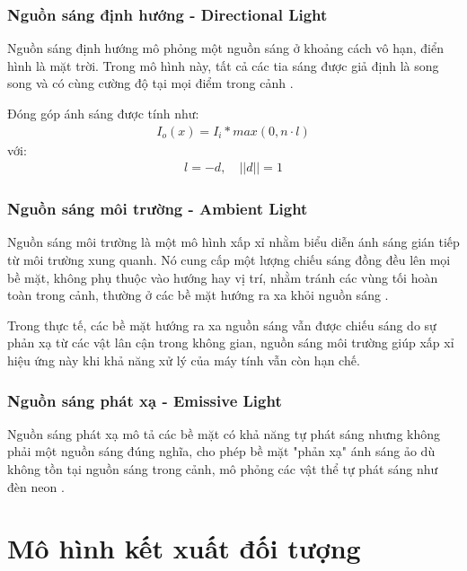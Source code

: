 \subsubsection{Nguồn sáng định hướng - Directional Light}
Nguồn sáng định hướng mô phỏng một nguồn sáng ở khoảng cách vô hạn, điển hình là mặt trời. Trong mô hình này, tất cả các tia sáng được giả định là song song và có cùng cường độ tại mọi điểm trong cảnh \cite{principles_1990}.

Đóng góp ánh sáng được tính như:
\begin{gather*}
	I_o(x) = I_i * max(0, n \cdot l)
\end{gather*}
với:
\begin{gather*}
	l = -d, \quad
	||d|| = 1
\end{gather*}

\subsubsection{Nguồn sáng môi trường - Ambient Light}
Nguồn sáng môi trường là một mô hình xấp xỉ nhằm biểu diễn ánh sáng gián tiếp từ môi trường xung quanh. Nó cung cấp một lượng chiếu sáng đồng đều lên mọi bề mặt, không phụ thuộc vào hướng hay vị trí, nhằm tránh các vùng tối hoàn toàn trong cảnh, thường ở các bề mặt hướng ra xa khỏi nguồn sáng \cite{principles_1990}.

Trong thực tế, các bề mặt hướng ra xa nguồn sáng vẫn được chiếu sáng do sự phản xạ từ các vật lân cận trong không gian, nguồn sáng môi trường giúp xấp xỉ hiệu ứng này khi khả năng xử lý của máy tính vẫn còn hạn chế.

\subsubsection{Nguồn sáng phát xạ - Emissive Light}
Nguồn sáng phát xạ mô tả các bề mặt có khả năng tự phát sáng nhưng không phải một nguồn sáng đúng nghĩa, cho phép bề mặt "phản xạ" ánh sáng ảo dù không tồn tại nguồn sáng trong cảnh, mô phỏng các vật thể tự phát sáng như đèn neon \cite{principles_1990}.

\section{Mô hình kết xuất đối tượng}


